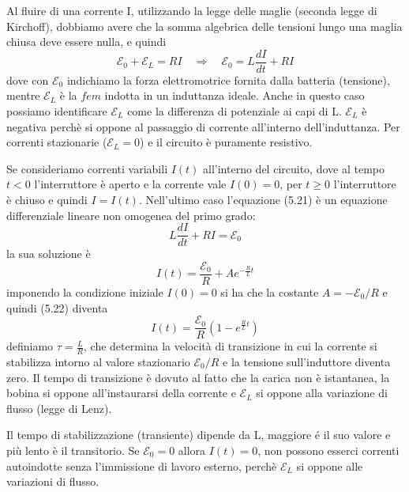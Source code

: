 Al fluire di una corrente I, utilizzando la legge delle maglie (seconda legge di Kirchoff), dobbiamo avere che la somma algebrica delle tensioni lungo una maglia chiusa deve essere nulla, e quindi 
\begin{equation}
	\mathcal{E}_0 + \mathcal{E}_{L} = RI \quad \Rightarrow \quad \mathcal{E}_0 = L\frac{d I}{dt} + RI
\end{equation}
dove con $\mathcal{E}_0$ indichiamo la forza elettromotrice fornita dalla batteria (tensione), mentre $\mathcal{E}_L$ \`e la $fem$ indotta in un induttanza ideale. Anche in questo caso possiamo identificare $\mathcal{E}_L$ come la differenza di potenziale ai capi di L.
$\mathcal{E}_L$ \`e negativa perch\`e si oppone al passaggio di corrente all'interno dell'induttanza. Per correnti stazionarie ($\mathcal{E}_L = 0$) e il circuito \`e puramente resistivo.
\newline

Se consideriamo correnti variabili $I(t)$ all'interno del circuito, dove al tempo $t<0$ l'interruttore \`e aperto e la corrente vale $I(0) = 0$, per $t \geq 0$ l'interruttore \`e chiuso e quindi $I =I(t)$. Nell'ultimo caso l'equazione (5.21) \`e un equazione differenziale lineare non omogenea del primo grado:
\begin{equation*}
	L \frac{dI}{dt} + RI = \mathcal{E}_0
\end{equation*}
la sua soluzione \`e
\begin{equation}
	I(t) = \frac{\mathcal{E}_0}{R} + A e^{-\frac{R}{L}t}
\end{equation} 
imponendo la condizione iniziale $I(0)=0$ si ha che la costante $A = - \mathcal{E}_0/R$ e quindi (5.22) diventa 
\begin{equation}
	I(t) = \frac{\mathcal{E}_0}{R}\left(1-e^{\frac{R}{L}t}\right)
\end{equation}
definiamo $\tau = \frac{L}{R}$, che determina la velocit\`a di transizione in cui la corrente si stabilizza intorno al valore stazionario $\mathcal{E}_0/R$ e la tensione sull'induttore diventa zero. Il tempo di transizione \`e dovuto al fatto che la carica non \`e istantanea, la bobina  si oppone all'instaurarsi della corrente e $\mathcal{E}_L$ si oppone alla variazione di flusso (legge di Lenz).

Il tempo di stabilizzazione (transiente) dipende da L, maggiore \'e il suo valore e pi\`u lento  \`e il transitorio. Se $\mathcal{E}_0 = 0$ allora $I(t) = 0$, non possono esserci correnti autoindotte senza l'immissione di lavoro esterno, perch\`e $\mathcal{E}_{L}$ si oppone alle variazioni di flusso.

